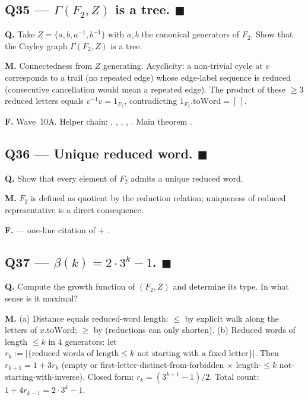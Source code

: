 \documentclass[11pt,a4paper]{article}
\newcommand{\done}[1]{\textcolor{donegreen}{\textbf{#1}}}
\newcommand{\FG}{F_2}
\theoremstyle{plain}
\theoremstyle{definition}
\begin{document}
\subsection{Q35 --- $\Gamma(F_2, Z)$ is a tree. \done{$\blacksquare$}}

\textbf{Q.} Take $Z = \{a, b, a^{-1}, b^{-1}\}$ with $a, b$ the
canonical generators of $F_2$. Show that the Cayley graph
$\Gamma(F_2, Z)$ is a tree.

\textbf{M.} Connectedness from $Z$ generating. Acyclicity: a
non-trivial cycle at $v$ corresponds to a trail
(no repeated edge) whose edge-label sequence is reduced (consecutive
cancellation would mean a repeated edge). The product of these
$\geq 3$ reduced letters equals $v^{-1}v = 1_{F_2}$, contradicting
$1_{F_2}.\mathrm{toWord} = [\,]$.

\textbf{F.} Wave~10A. Helper chain:
, ,
, , .
Main theorem .

\subsection{Q36 --- Unique reduced word. \done{$\blacksquare$}}

\textbf{Q.} Show that every element of $F_2$ admits a unique
reduced word.

\textbf{M.} $\FG$ is defined as quotient by the reduction
relation; uniqueness of reduced representative is a direct
consequence.

\textbf{F.}  --- one-line citation
of  + .

\subsection{Q37 --- $\beta(k) = 2 \cdot 3^k - 1$. \done{$\blacksquare$}}

\textbf{Q.} Compute the growth function of $(F_2, Z)$ and determine
its type. In what sense is it maximal?

\textbf{M.} (a) Distance equals reduced-word length: $\leq$ by
explicit walk along the letters of $x.\mathrm{toWord}$; $\geq$ by
 (reductions can only shorten).
(b) Reduced words of length $\leq k$ in 4 generators: let $r_k :=
|\{\text{reduced words of length} \leq k \text{ not starting with a fixed letter}\}|$.
Then $r_{k+1} = 1 + 3 r_k$ (empty or first-letter-distinct-from-forbidden
$\times$ length-$\leq k$ not-starting-with-inverse). Closed form:
$r_k = (3^{k+1} - 1)/2$. Total count: $1 + 4 r_{k-1} = 2 \cdot 3^k - 1$.
\end{document}
